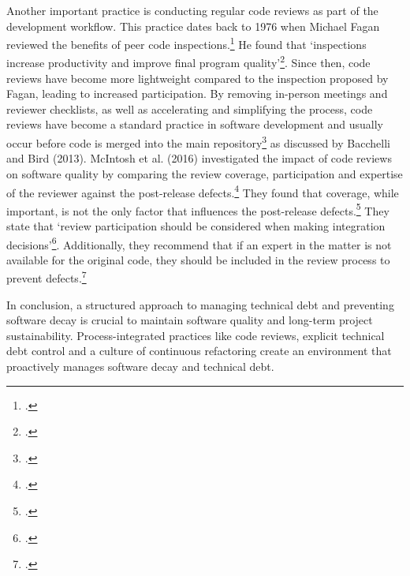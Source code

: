 Another important practice is conducting regular code reviews as part of the development workflow. This practice dates back to 1976 when Michael Fagan reviewed the benefits of peer code inspections.\footcite[183]{faganDesignCodeInspections1976}
He found that `inspections increase productivity and improve final program quality'\footcite[205]{faganDesignCodeInspections1976}.
Since then, code reviews have become more lightweight compared to the inspection proposed by Fagan, leading to increased participation. By removing in-person meetings and reviewer checklists, as well as accelerating and simplifying the process, code reviews have become a standard practice in software development and usually occur before code is merged into the main repository\footcite[2]{bacchelliExpectationsOutcomesChallenges2013} as discussed by Bacchelli and Bird (2013).
McIntosh et al. (2016) investigated the impact of code reviews on software quality by comparing the review coverage, participation and expertise of the reviewer against the post-release defects.\footcite[6]{mcintoshEmpiricalStudyImpact2016}
They found that coverage, while important, is not the only factor that influences the post-release defects.\footcite[39]{mcintoshEmpiricalStudyImpact2016}
They state that `review participation should be considered when making integration decisions'\footcite[39]{mcintoshEmpiricalStudyImpact2016}.
Additionally, they recommend that if an expert in the matter is not available for the original code, they should be included in the review process to prevent defects.\footcite[39]{mcintoshEmpiricalStudyImpact2016}

In conclusion, a structured approach to managing technical debt and preventing software decay is crucial to maintain software quality and long-term project sustainability.
Process-integrated practices like code reviews, explicit technical debt control and a culture of continuous refactoring create an environment that proactively manages software decay and technical debt.

